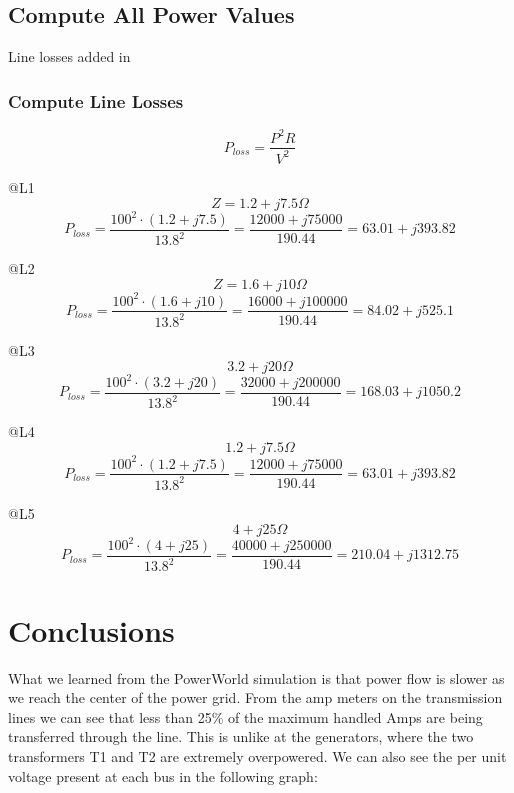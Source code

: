 \documentclass[12pt]{article}
\begin{document}
    

        \subsection{Compute All Power Values}
         Line losses added in

        \subsubsection{Compute Line Losses}
        $$P_{loss}=\frac{P^2R}{V^2}$$

        @L1
        $$Z=1.2+j7.5\Omega$$
        $$P_{loss}=\frac{100^2\cdot (1.2+j7.5)}{13.8^2}=\frac{12000+j75000}{190.44}=63.01+j393.82$$

        @L2
        $$Z=1.6+j10\Omega$$
        $$P_{loss}=\frac{100^2\cdot (1.6+j10)}{13.8^2}=\frac{16000+j100000}{190.44}=84.02+j525.1$$

        @L3
        $$3.2+j20\Omega$$
        $$P_{loss}=\frac{100^2\cdot (3.2+j20)}{13.8^2}=\frac{32000+j200000}{190.44}=168.03+j1050.2$$

        @L4
        $$1.2+j7.5\Omega$$
        $$P_{loss}=\frac{100^2\cdot (1.2+j7.5)}{13.8^2}=\frac{12000+j75000}{190.44}=63.01+j393.82$$
        
        @L5
        $$4+j25\Omega$$
        $$P_{loss}=\frac{100^2\cdot (4+j25)}{13.8^2}=\frac{40000+j250000}{190.44}=210.04+j1312.75$$
        
        
        \newpage

        \section{Conclusions}
		\indent\par{What we learned from the PowerWorld simulation is that power flow is slower as we reach the center of the power grid. From the amp meters on the transmission lines we can see that less than 25\% of the maximum handled Amps are being transferred through the line. This is unlike at the generators, where the two transformers T1 and T2 are extremely overpowered. We can also see the per unit voltage present at each bus in the following graph:}
		
\end{document}
